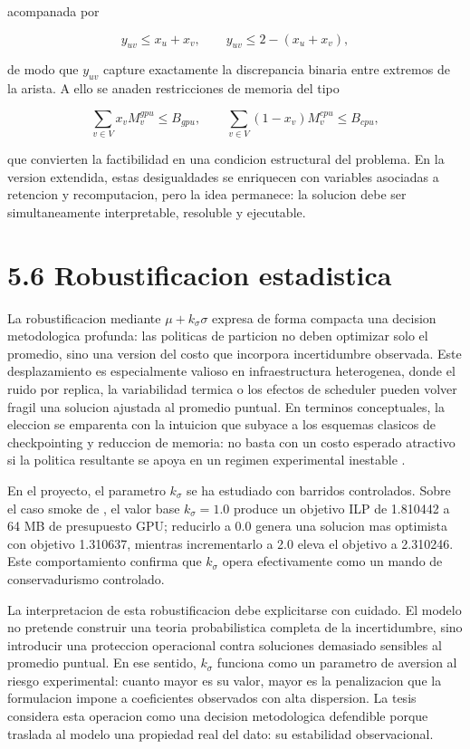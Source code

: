 acompanada por

$$
y_{uv} \le x_u + x_v, \qquad
y_{uv} \le 2 - (x_u + x_v),
$$

de modo que $y_{uv}$ capture exactamente la discrepancia binaria entre extremos de la arista. A ello se anaden restricciones de memoria del tipo

$$
\sum_{v \in V} x_v M^{gpu}_v \le B_{gpu}, \qquad
\sum_{v \in V} (1-x_v) M^{cpu}_v \le B_{cpu},
$$

que convierten la factibilidad en una condicion estructural del problema. En la version extendida, estas desigualdades se enriquecen con variables asociadas a retencion y recomputacion, pero la idea permanece: la solucion debe ser simultaneamente interpretable, resoluble y ejecutable.

\section{5.6 Robustificacion estadistica}
La robustificacion mediante $\mu + k_\sigma\sigma$ expresa de forma compacta una decision metodologica profunda: las politicas de particion no deben optimizar solo el promedio, sino una version del costo que incorpora incertidumbre observada. Este desplazamiento es especialmente valioso en infraestructura heterogenea, donde el ruido por replica, la variabilidad termica o los efectos de scheduler pueden volver fragil una solucion ajustada al promedio puntual. En terminos conceptuales, la eleccion se emparenta con la intuicion que subyace a los esquemas clasicos de checkpointing y reduccion de memoria: no basta con un costo esperado atractivo si la politica resultante se apoya en un regimen experimental inestable \cite{griewank2000revolve,chen2016sublinear}.

En el proyecto, el parametro $k_\sigma$ se ha estudiado con barridos controlados. Sobre el caso smoke de , el valor base $k_\sigma=1.0$ produce un objetivo ILP de 1.810442 a 64 MB de presupuesto GPU; reducirlo a 0.0 genera una solucion mas optimista con objetivo 1.310637, mientras incrementarlo a 2.0 eleva el objetivo a 2.310246. Este comportamiento confirma que $k_\sigma$ opera efectivamente como un mando de conservadurismo controlado.

La interpretacion de esta robustificacion debe explicitarse con cuidado. El modelo no pretende construir una teoria probabilistica completa de la incertidumbre, sino introducir una proteccion operacional contra soluciones demasiado sensibles al promedio puntual. En ese sentido, $k_\sigma$ funciona como un parametro de aversion al riesgo experimental: cuanto mayor es su valor, mayor es la penalizacion que la formulacion impone a coeficientes observados con alta dispersion. La tesis considera esta operacion como una decision metodologica defendible porque traslada al modelo una propiedad real del dato: su estabilidad observacional.

